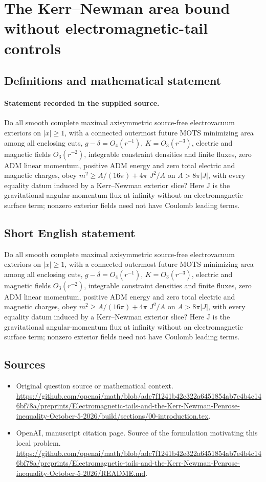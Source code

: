 \documentclass[11pt]{article}
\begin{document}
\section*{The Kerr–Newman area bound without electromagnetic-tail controls}\label{30007230}
\subsection{Definitions and mathematical statement}
\paragraph{Statement recorded in the supplied source.}
Do all smooth complete maximal axisymmetric source-free electrovacuum exteriors on ${|x|\geq 1}$, with a connected outermost future MOTS minimizing area among all enclosing cuts, $g-\delta =O_4(r^{-1})$, $K=O_3(r^{-3})$, electric and magnetic fields $O_3(r^{-2})$, integrable constraint densities and finite fluxes, zero ADM linear momentum, positive ADM energy and zero total electric and magnetic charges, obey $m^2\geq A/(16\pi )+4\pi $ $J^2/A$ on $A>8\pi |J|$, with every equality datum induced by a Kerr–Newman exterior slice? Here J is the gravitational angular-momentum flux at infinity without an electromagnetic surface term; nonzero exterior fields need not have Coulomb leading terms.
\subsection{Short English statement}
Do all smooth complete maximal axisymmetric source-free electrovacuum exteriors on ${|x|\geq 1}$, with a connected outermost future MOTS minimizing area among all enclosing cuts, $g-\delta =O_4(r^{-1})$, $K=O_3(r^{-3})$, electric and magnetic fields $O_3(r^{-2})$, integrable constraint densities and finite fluxes, zero ADM linear momentum, positive ADM energy and zero total electric and magnetic charges, obey $m^2\geq A/(16\pi )+4\pi $ $J^2/A$ on $A>8\pi |J|$, with every equality datum induced by a Kerr–Newman exterior slice? Here J is the gravitational angular-momentum flux at infinity without an electromagnetic surface term; nonzero exterior fields need not have Coulomb leading terms.
\subsection{Sources}
\begin{itemize}
\item[S1] Original question source or mathematical context.
\url{https://github.com/openai/math/blob/adc7f1241b42e322a6451854ab7e4b4c146bf78a/preprints/Electromagnetic-tails-and-the-Kerr-Newman-Penrose-inequality-October-5-2026/build/sections/00-introduction.tex}.
\item[S2] OpenAI, manuscript citation page. Source of the formulation motivating this local problem.
\url{https://github.com/openai/math/blob/adc7f1241b42e322a6451854ab7e4b4c146bf78a/preprints/Electromagnetic-tails-and-the-Kerr-Newman-Penrose-inequality-October-5-2026/README.md}.
\end{itemize}
\end{document}

